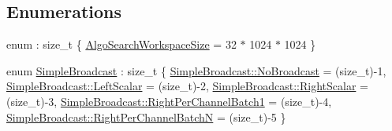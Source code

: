\subsection*{Enumerations}
\begin{DoxyCompactItemize}
\item 
enum \+: size\+\_\+t \{ \mbox{\hyperlink{namespaceonnxruntime_1_1cuda_af141cf21c6b64c85617abb96202bb948a5b57b98b7bc56657f65dea953fae7666}{Algo\+Search\+Workspace\+Size}} = 32 $\ast$ 1024 $\ast$ 1024
 \}
\item 
enum \mbox{\hyperlink{namespaceonnxruntime_1_1cuda_aa9f83573eddf1eee5577bb1c6aaae920}{Simple\+Broadcast}} \+: size\+\_\+t \{ \newline
\mbox{\hyperlink{namespaceonnxruntime_1_1cuda_aa9f83573eddf1eee5577bb1c6aaae920a60212413510a410bf5192f109ecc4815}{Simple\+Broadcast\+::\+No\+Broadcast}} = (size\+\_\+t)-\/1, 
\mbox{\hyperlink{namespaceonnxruntime_1_1cuda_aa9f83573eddf1eee5577bb1c6aaae920a2121638796bb7e7f58ffecfb894c7135}{Simple\+Broadcast\+::\+Left\+Scalar}} = (size\+\_\+t)-\/2, 
\mbox{\hyperlink{namespaceonnxruntime_1_1cuda_aa9f83573eddf1eee5577bb1c6aaae920ad5cf49141f858c55da2682a66aa8dde6}{Simple\+Broadcast\+::\+Right\+Scalar}} = (size\+\_\+t)-\/3, 
\mbox{\hyperlink{namespaceonnxruntime_1_1cuda_aa9f83573eddf1eee5577bb1c6aaae920af3c8c9fc27b1c282146c15e980adf190}{Simple\+Broadcast\+::\+Right\+Per\+Channel\+Batch1}} = (size\+\_\+t)-\/4, 
\newline
\mbox{\hyperlink{namespaceonnxruntime_1_1cuda_aa9f83573eddf1eee5577bb1c6aaae920ab907e3ea1ad58d2a08b02de5e8a27131}{Simple\+Broadcast\+::\+Right\+Per\+Channel\+BatchN}} = (size\+\_\+t)-\/5
 \}
\end{DoxyCompactItemize}
